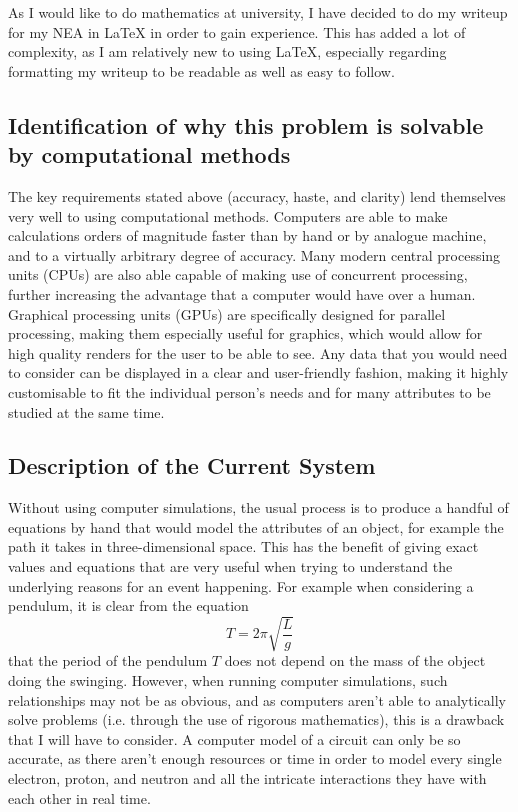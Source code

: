 \documentclass[11pt]{article}
\begin{document}
            As I would like to do mathematics at university, I have decided to do my writeup for my NEA in LaTeX in order to gain experience. This has added a lot of complexity, as I am relatively new to using LaTeX, especially regarding formatting my writeup to be readable as well as easy to follow.

        \subsection{Identification of why this problem is solvable by computational methods}
            The key requirements stated above (accuracy, haste, and clarity) lend themselves very well to using computational methods. Computers are able to make calculations orders of magnitude faster than by hand or by analogue machine, and to a virtually arbitrary degree of accuracy. Many modern central processing units (CPUs) are also able capable of making use of concurrent processing, further increasing the advantage that a computer would have over a human. Graphical processing units (GPUs) are specifically designed for parallel processing, making them especially useful for graphics, which would allow for high quality renders for the user to be able to see. Any data that you would need to consider can be displayed in a clear and user-friendly fashion, making it highly customisable to fit the individual person's needs and for many attributes to be studied at the same time.

        \subsection{Description of the Current System}
            Without using computer simulations, the usual process is to produce a handful of equations by hand that would model the attributes of an object, for example the path it takes in three-dimensional space. This has the benefit of giving exact values and equations that are very useful when trying to understand the underlying reasons for an event happening. For example when considering a pendulum, it is clear from the equation $$ T = 2 \pi \sqrt{\frac{L}{g}} $$ that the period of the pendulum $T$ does not depend on the mass of the object doing the swinging. However, when running computer simulations, such relationships may not be as obvious, and as computers aren't able to analytically solve problems (i.e. through the use of rigorous mathematics), this is a drawback that I will have to consider. A computer model of a circuit can only be so accurate, as there aren't enough resources or time in order to model every single electron, proton, and neutron and all the intricate interactions they have with each other in real time.
            
\end{document}
